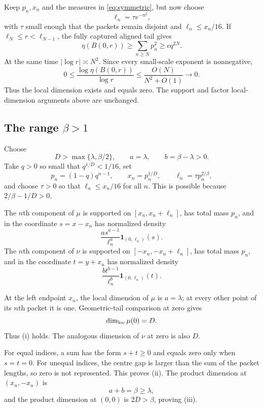 \documentclass[11pt]{article}
\begin{document}
Keep $p_n,x_n$ and the measures in \eqref{eq:symmetric}, but now choose
\[
 \ell_n=\tau e^{-n^2},
\]
with $\tau$ small enough that the packets remain disjoint and
$\ell_n\leq x_n/16$.  If
$\ell_N\leq r<\ell_{N-1}$, the fully captured aligned tail gives
\[
 \eta(B(0,r))\geq\sum_{n\geq N}p_n^2\geq c q^{2N}.
\]
At the same time $|\log r|\asymp N^2$.  Since every small-scale exponent is
nonnegative,
\[
 0\leq\frac{\log\eta(B(0,r))}{\log r}
 \leq\frac{O(N)}{N^2+O(1)}\longrightarrow0.
\]
Thus the local dimension exists and equals zero.  The support and factor
local-dimension arguments above are unchanged.

\subsection{The range \texorpdfstring{$\beta>1$}{beta > 1}}

Choose
\[
 D>\max\{\lambda,\beta/2\},
 \qquad a=\lambda,
 \qquad b=\beta-\lambda>0.
\]
Take $q>0$ so small that $q^{1/D}<1/16$, set
\[
 p_n=(1-q)q^{n-1},
 \qquad x_n=p_n^{1/D},
 \qquad \ell_n=\tau p_n^{2/\beta},
\]
and choose $\tau>0$ so that $\ell_n\leq x_n/16$ for all $n$.  This is
possible because $2/\beta-1/D>0$.

The $n$th component of $\mu$ is supported on
$[x_n,x_n+\ell_n]$, has total mass $p_n$, and in the coordinate
$s=x-x_n$ has normalized density
\[
 \frac{a s^{a-1}}{\ell_n^a}\mathbf1_{(0,\ell_n)}(s).
\]
The $n$th component of $\nu$ is supported on
$[-x_n,-x_n+\ell_n]$, has total mass $p_n$, and in the coordinate
$t=y+x_n$ has normalized density
\[
 \frac{b t^{b-1}}{\ell_n^b}\mathbf1_{(0,\ell_n)}(t).
\]

At the left endpoint $x_n$, the local dimension of $\mu$ is $a=\lambda$;
at every other point of its $n$th packet it is one.  Geometric-tail comparison
at zero gives
\[
 \dim_{\rm loc}\mu(0)=D.
\]
Thus (i) holds.  The analogous dimension of $\nu$ at zero is also $D$.

For equal indices, a sum has the form $s+t\geq0$ and equals zero only when
$s=t=0$.  For unequal indices, the centre gap is larger than the sum of the
packet lengths, so zero is not represented.  This proves (ii).  The product
dimension at $(x_n,-x_n)$ is
\[
 a+b=\beta\geq\lambda,
\]
and the product dimension at $(0,0)$ is $2D>\beta$, proving (iii).
\end{document}
